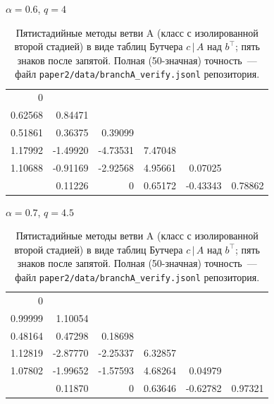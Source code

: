 \begin{table}[ht]
\centering
\caption{Пятистадийные методы ветви A (класс с изолированной второй стадией) в виде таблиц Бутчера $c\,|\,A$ над $b^{\top}$; пять знаков после запятой. Полная (50-значная) точность~--- файл \texttt{paper2/data/branchA\_verify.jsonl} репозитория.}\label{tab:butcher5}
\begin{minipage}[t]{0.49\textwidth}\centering $\alpha=0.6$, $q=4$\\[3pt]
{\footnotesize\setlength{\tabcolsep}{2.5pt}
\begin{tabular}{r|rrrrr}
0 &  &  &  &  &  \\
0.62568 & 0.84471 &  &  &  &  \\
0.51861 & 0.36375 & 0.39099 &  &  &  \\
1.17992 & -1.49920 & -4.73531 & 7.47048 &  &  \\
1.10688 & -0.91169 & -2.92568 & 4.95661 & 0.07025 &  \\
\hline
 & 0.11226 & 0 & 0.65172 & -0.43343 & 0.78862
\end{tabular}}
\end{minipage}\hfill\begin{minipage}[t]{0.49\textwidth}\centering $\alpha=0.7$, $q=4.5$\\[3pt]
{\footnotesize\setlength{\tabcolsep}{2.5pt}
\begin{tabular}{r|rrrrr}
0 &  &  &  &  &  \\
0.99999 & 1.10054 &  &  &  &  \\
0.48164 & 0.47298 & 0.18698 &  &  &  \\
1.12819 & -2.87770 & -2.25337 & 6.32857 &  &  \\
1.07802 & -1.99652 & -1.57593 & 4.68264 & 0.04979 &  \\
\hline
 & 0.11870 & 0 & 0.63646 & -0.62782 & 0.97321
\end{tabular}}
\end{minipage}


\end{table}
